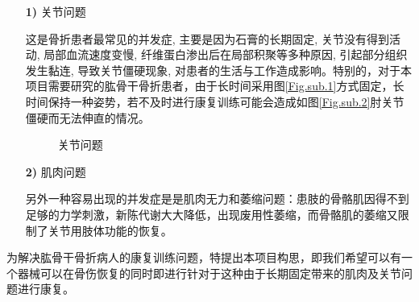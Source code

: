\documentclass[UTF8]{ctexart}
\begin{document}
        \begin{enumerate}
            \item[\textbf{1)}]关节问题
            
                这是骨折患者最常见的并发症, 主要是因为石膏的长期固定, 关节没有得到活动, 局部血流速度变慢, 纤维蛋白渗出后在局部积聚等多种原因, 引起部分组织发生黏连, 导致关节僵硬现象, 对患者的生活与工作造成影响。特别的，对于本项目需要研究的肱骨干骨折患者，由于长时间采用图\ref{Fig.sub.1}方式固定，长时间保持一种姿势，若不及时进行康复训练可能会造成如图\ref{Fig.sub.2}肘关节僵硬而无法伸直的情况。
                \begin{figure}[H]
                    \centering  %
                    \label{Fig.main}
                    \caption{关节问题}
                \end{figure}
                    
            \item[\textbf{2)}] 肌肉问题
             
                另外一种容易出现的并发症是是肌肉无力和萎缩问题：患肢的骨骼肌因得不到足够的力学刺激，新陈代谢大大降低，出现废用性萎缩，而骨骼肌的萎缩又限制了关节用肢体功能的恢复。 
        \end{enumerate}

        为解决肱骨干骨折病人的康复训练问题，特提出本项目构思，即我们希望可以有一个器械可以在骨伤恢复的同时即进行针对于这种由于长期固定带来的肌肉及关节问题进行康复。
\end{document}
